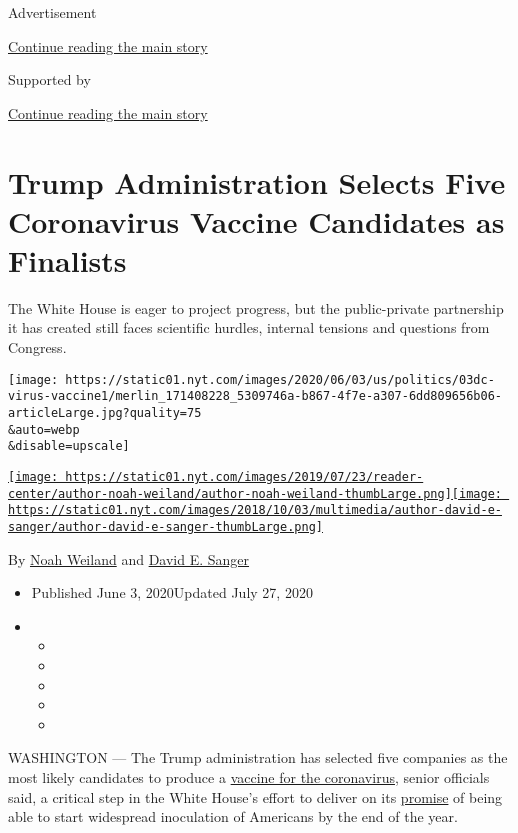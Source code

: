 Advertisement

\protect\hyperlink{after-top}{Continue reading the main story}

Supported by

\protect\hyperlink{after-sponsor}{Continue reading the main story}

\hypertarget{trump-administration-selects-five-coronavirus-vaccine-candidates-as-finalists}{%
\section{Trump Administration Selects Five Coronavirus Vaccine
Candidates as
Finalists}\label{trump-administration-selects-five-coronavirus-vaccine-candidates-as-finalists}}

The White House is eager to project progress, but the public-private
partnership it has created still faces scientific hurdles, internal
tensions and questions from Congress.

\texttt{[image: https://static01.nyt.com/images/2020/06/03/us/politics/03dc-virus-vaccine1/merlin\_171408228\_5309746a-b867-4f7e-a307-6dd809656b06-articleLarge.jpg?quality=75\\\&auto=webp\\\&disable=upscale]}

\href{https://www.nytimes.com/by/noah-weiland}{\texttt{[image: https://static01.nyt.com/images/2019/07/23/reader-center/author-noah-weiland/author-noah-weiland-thumbLarge.png]}}\href{https://www.nytimes.com/by/david-e-sanger}{\texttt{[image: https://static01.nyt.com/images/2018/10/03/multimedia/author-david-e-sanger/author-david-e-sanger-thumbLarge.png]}}

By \href{https://www.nytimes.com/by/noah-weiland}{Noah Weiland} and
\href{https://www.nytimes.com/by/david-e-sanger}{David E. Sanger}

\begin{itemize}
\item
  Published June 3, 2020Updated July 27, 2020
\item
  \begin{itemize}
  \item
  \item
  \item
  \item
  \item
  \end{itemize}
\end{itemize}

WASHINGTON --- The Trump administration has selected five companies as
the most likely candidates to produce a
\href{https://www.nytimes.com/2020/07/27/health/moderna-vaccine-covid.html}{vaccine
for the coronavirus}, senior officials said, a critical step in the
White House's effort to deliver on its
\href{https://www.nytimes.com/2020/05/15/us/politics/coronavirus-vaccine-timeline.html}{promise}
of being able to start widespread inoculation of Americans by the end of
the year.

